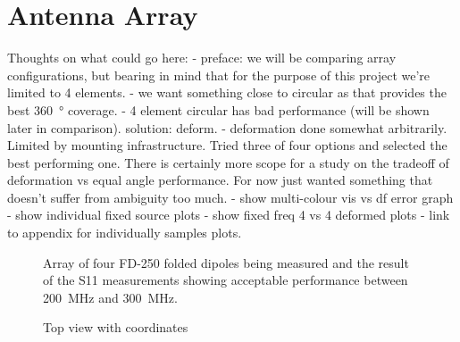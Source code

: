 \section{Antenna Array}

Thoughts on what could go here:
- preface: we will be comparing array configurations, but bearing in mind that for the purpose of this project we're limited to 4 elements.
- we want something close to circular as that provides the best \SI{360}{\degree} coverage.
- 4 element circular has bad performance (will be shown later in comparison). solution: deform.
- deformation done somewhat arbitrarily. Limited by mounting infrastructure. Tried three of four options and selected the best performing one. There is certainly more scope for a study on the tradeoff of deformation vs equal angle performance. For now just wanted something that doesn't suffer from ambiguity too much.
- show multi-colour vis vs df error graph
- show individual fixed source plots
- show fixed freq 4 vs 4 deformed plots
- link to appendix for individually samples plots.

\begin{landscape}
  \thispagestyle{empty}
  \begin{figure}
    \centering
    \caption{Array of four FD-250 folded dipoles being measured and the result of the S11 measurements showing acceptable performance between \SI{200}{\mega\hertz} and \SI{300}{\mega\hertz}.}
  \end{figure}
\end{landscape}
\thispagestyle{empty}
\begin{landscape}
  \begin{figure}
    \centering
    \caption{Top view with coordinates}
  \end{figure}
\end{landscape}

